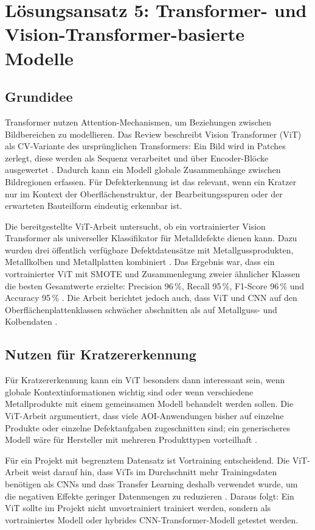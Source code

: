 \documentclass[11pt,a4paper]{article}
\begin{document}
\section{Lösungsansatz 5: Transformer- und Vision-Transformer-basierte Modelle}

\subsection{Grundidee}

Transformer nutzen Attention-Mechanismen, um Beziehungen zwischen Bildbereichen zu modellieren. Das Review beschreibt Vision Transformer (ViT) als CV-Variante des ursprünglichen Transformers: Ein Bild wird in Patches zerlegt, diese werden als Sequenz verarbeitet und über Encoder-Blöcke ausgewertet \cite{applications_review}. Dadurch kann ein Modell globale Zusammenhänge zwischen Bildregionen erfassen. Für Defekterkennung ist das relevant, wenn ein Kratzer nur im Kontext der Oberflächenstruktur, der Bearbeitungsspuren oder der erwarteten Bauteilform eindeutig erkennbar ist.

Die bereitgestellte ViT-Arbeit untersucht, ob ein vortrainierter Vision Transformer als universeller Klassifikator für Metalldefekte dienen kann. Dazu wurden drei öffentlich verfügbare Defektdatensätze mit Metallgussprodukten, Metallkolben und Metallplatten kombiniert \cite{vit_thesis}. Das Ergebnis war, dass ein vortrainierter ViT mit SMOTE und Zusammenlegung zweier ähnlicher Klassen die besten Gesamtwerte erzielte: Precision 96\,\%, Recall 95\,\%, F1-Score 96\,\% und Accuracy 95\,\% \cite{vit_thesis}. Die Arbeit berichtet jedoch auch, dass ViT und CNN auf den Oberflächenplattenklassen schwächer abschnitten als auf Metallguss- und Kolbendaten \cite{vit_thesis}.

\subsection{Nutzen für Kratzererkennung}

Für Kratzererkennung kann ein ViT besonders dann interessant sein, wenn globale Kontextinformationen wichtig sind oder wenn verschiedene Metallprodukte mit einem gemeinsamen Modell behandelt werden sollen. Die ViT-Arbeit argumentiert, dass viele AOI-Anwendungen bisher auf einzelne Produkte oder einzelne Defektaufgaben zugeschnitten sind; ein generischeres Modell wäre für Hersteller mit mehreren Produkttypen vorteilhaft \cite{vit_thesis}. 

Für ein Projekt mit begrenztem Datensatz ist Vortraining entscheidend. Die ViT-Arbeit weist darauf hin, dass ViTs im Durchschnitt mehr Trainingsdaten benötigen als CNNs und dass Transfer Learning deshalb verwendet wurde, um die negativen Effekte geringer Datenmengen zu reduzieren \cite{vit_thesis}. Daraus folgt: Ein ViT sollte im Projekt nicht unvortrainiert trainiert werden, sondern als vortrainiertes Modell oder hybrides CNN-Transformer-Modell getestet werden.
\end{document}
